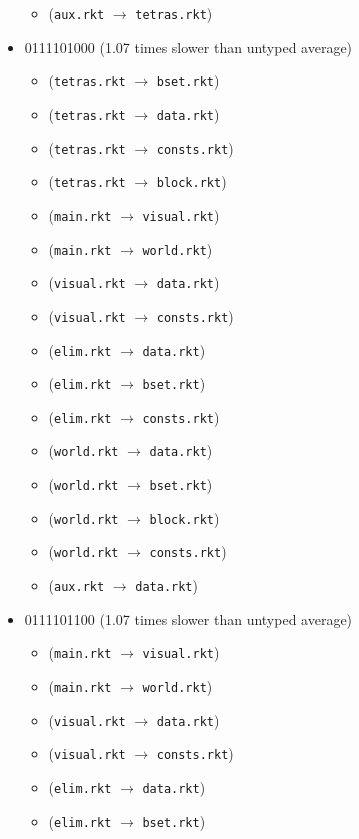 \documentclass{article}
\newcommand{\mono}[1]{\texttt{#1}}
\begin{document}
\begin{itemize}
\begin{itemize}
  \item (\mono{aux.rkt} $\rightarrow$ \mono{tetras.rkt})
  \end{itemize}
\item 0111101000 (1.07 times slower than untyped average)
  \begin{itemize}
  \item (\mono{tetras.rkt} $\rightarrow$ \mono{bset.rkt})
  \item (\mono{tetras.rkt} $\rightarrow$ \mono{data.rkt})
  \item (\mono{tetras.rkt} $\rightarrow$ \mono{consts.rkt})
  \item (\mono{tetras.rkt} $\rightarrow$ \mono{block.rkt})
  \item (\mono{main.rkt} $\rightarrow$ \mono{visual.rkt})
  \item (\mono{main.rkt} $\rightarrow$ \mono{world.rkt})
  \item (\mono{visual.rkt} $\rightarrow$ \mono{data.rkt})
  \item (\mono{visual.rkt} $\rightarrow$ \mono{consts.rkt})
  \item (\mono{elim.rkt} $\rightarrow$ \mono{data.rkt})
  \item (\mono{elim.rkt} $\rightarrow$ \mono{bset.rkt})
  \item (\mono{elim.rkt} $\rightarrow$ \mono{consts.rkt})
  \item (\mono{world.rkt} $\rightarrow$ \mono{data.rkt})
  \item (\mono{world.rkt} $\rightarrow$ \mono{bset.rkt})
  \item (\mono{world.rkt} $\rightarrow$ \mono{block.rkt})
  \item (\mono{world.rkt} $\rightarrow$ \mono{consts.rkt})
  \item (\mono{aux.rkt} $\rightarrow$ \mono{data.rkt})
  \end{itemize}
\item 0111101100 (1.07 times slower than untyped average)
  \begin{itemize}
  \item (\mono{main.rkt} $\rightarrow$ \mono{visual.rkt})
  \item (\mono{main.rkt} $\rightarrow$ \mono{world.rkt})
  \item (\mono{visual.rkt} $\rightarrow$ \mono{data.rkt})
  \item (\mono{visual.rkt} $\rightarrow$ \mono{consts.rkt})
  \item (\mono{elim.rkt} $\rightarrow$ \mono{data.rkt})
  \item (\mono{elim.rkt} $\rightarrow$ \mono{bset.rkt})

\end{itemize}
\end{itemize}
\end{document}
